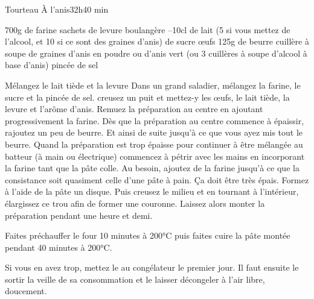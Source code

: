 \begin{recette}{Tourteau À l'anis}{3}{2h}{40 min}
\begin{ingredients}
\ingredient 700g de farine
 sachets de levure boulangère %
--10cl de lait (5 si vous mettez de l'alcool, et 10 si ce sont des graines d'anis)
 de sucre
 œufs
\ingredient 125g de beurre
 cuillère à soupe de graines d’anis en poudre ou d'anis vert (ou 3 cuillères à soupe d'alcool à base d'anis)
 pincée de sel
\end{ingredients}

\begin{preparation}
\etape Mélangez le lait tiède et la levure
\etape Dans un grand saladier, mélangez la farine, le sucre et la pincée de sel.
\etape creusez un puit et mettez-y les œufs, le lait tiède, la levure et l'arôme d'anis. Remuez la préparation au centre en ajoutant progressivement la farine. 
\etape Dès que la préparation au centre commence à épaissir, rajoutez un peu de beurre. Et ainsi de suite jusqu'à ce que vous ayez mis tout le  beurre. 
\etape Quand la préparation est trop épaisse pour continuer à être mélangée au batteur (à main ou électrique) commencez à pétrir avec les mains en incorporant la farine tant que la pâte colle. 
\etape Au besoin, ajoutez de la farine jusqu'à ce que la consistance soit quasiment celle d'une pâte à pain. Ça doit être très épais.
\etape Formez à l'aide de la pâte un disque. Puis creusez le milieu et en tournant à l'intérieur, élargissez ce trou afin de former une couronne. Laissez alors monter la préparation pendant une heure et demi.
\end{preparation}

\begin{cuisson}
Faites préchauffer le four 10 minutes à 200°C puis faites cuire la pâte montée pendant 40 minutes à 200°C.
\end{cuisson}
\begin{remarque}
Si vous en avez trop, mettez le au congélateur le premier jour. Il faut ensuite le sortir la veille de sa consommation et le laisser décongeler à l'air libre, doucement. 
\end{remarque}

\end{recette}